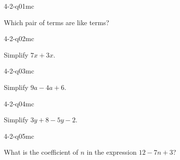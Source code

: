 

\begin{practiceQuestion}{4-2-q01}{mc}
\begin{questionText}
Which pair of terms are like terms?
\end{questionText}
\end{practiceQuestion}

\begin{practiceQuestion}{4-2-q02}{mc}
\begin{questionText}
Simplify $7x + 3x$.
\end{questionText}
\end{practiceQuestion}

\begin{practiceQuestion}{4-2-q03}{mc}
\begin{questionText}
Simplify $9a - 4a + 6$.
\end{questionText}
\end{practiceQuestion}

\begin{practiceQuestion}{4-2-q04}{mc}
\begin{questionText}
Simplify $3y + 8 - 5y - 2$.
\end{questionText}
\end{practiceQuestion}

\begin{practiceQuestion}{4-2-q05}{mc}
\begin{questionText}
What is the coefficient of $n$ in the expression $12 - 7n + 3$?
\end{questionText}
\end{practiceQuestion}

